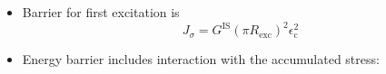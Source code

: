 \begin{frame}
\begin{columns}[T]
\begin{column}[T]{0.5\textwidth}
\begin{itemize}
    \item<2->Barrier for first excitation is 
    \begin{equation*}
    J_\sigma = G^\mathrm{IS} (\pi R_\mathrm{exc})^2 \epsilon_\mathrm{c}^2
    \end{equation*}
    \item<9-> Energy barrier includes interaction with the accumulated stress:
\end{itemize}

\end{column}
\end{columns}

\end{frame}

